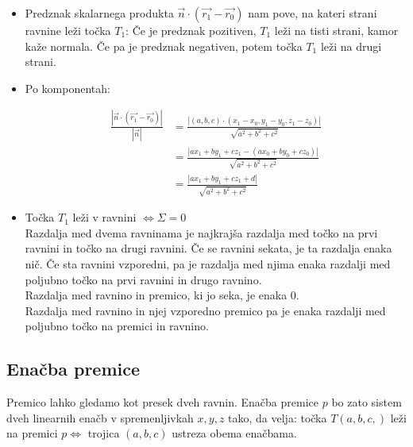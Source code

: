 \documentclass[a4paper,12pt]{article}
\begin{document}
\begin{itemize}
\item Predznak skalarnega produkta $\vec{n}\cdot(\vec{r_1}-\vec{r_0})$ nam pove, na kateri strani ravnine leži točka $T_1$: Če je predznak pozitiven, $T_1$ leži na tisti strani, kamor kaže normala. Če pa je predznak negativen, potem točka $T_1$ leži na drugi strani.\\

\item Po komponentah: 

\begin{align*}
\frac{|\vec{n}\cdot(\vec{r_1}-\vec{r_0})|}{|\vec{n}|} & = \frac{|(a,b,c)\cdot(x_1-x_0,y_1-y_0,z_1-z_0)|}{\sqrt{a^2+b^2+c^2}} \\
& = \frac{|a x_1 + b y_1 + c z_1 - (a x_0 + b y_0 + c z_0)|}{\sqrt{a^2+b^2+c^2}} \\
& = \frac{|a x_1 + b y_1 + c z_1 + d|}{\sqrt{a^2+b^2+c^2}}
\end{align*}

\item Točka $T_1$ leži v ravnini $\Leftrightarrow \Sigma =0$ \\

Razdalja med dvema ravninama je najkrajša razdalja med točko na prvi ravnini in točko na drugi ravnini. Če se ravnini sekata, je ta razdalja enaka nič. Če sta ravnini vzporedni, pa je razdalja med njima enaka razdalji med poljubno točko na prvi ravnini in drugo ravnino. \\

Razdalja med ravnino in premico, ki jo seka, je enaka 0. \\

Razdalja med ravnino in njej vzporedno premico pa je enaka razdalji med poljubno točko na premici in ravnino. \\

\end{itemize}

\newpage

\begin{center}
\subsection{Enačba premice}
\end{center}

Premico lahko gledamo kot presek dveh ravnin. Enačba premice $p$ bo zato sistem dveh linearnih enačb v spremenljivkah $x,y,z$ tako, da velja: točka $T(a,b,c,)$ leži na premici $p \Leftrightarrow $ trojica $ (a,b,c)$ ustreza obema enačbama.\\
\end{document}
